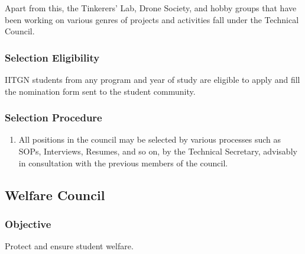 \documentclass[12pt]{article}
\begin{document}
Apart from this, the Tinkerers’ Lab, Drone Society, and hobby groups that have been working on various genres of projects and activities fall under the Technical Council.

\subsubsection{Selection Eligibility}
IITGN students from any program and year of study are eligible to apply and fill the nomination form sent to the student community.

\subsubsection{Selection Procedure}
\begin{enumerate}
    \item All positions in the council may be selected by various processes such as SOPs, Interviews, Resumes, and so on, by the Technical Secretary, advisably in consultation with the previous members of the council.
\end{enumerate}


\newpage
\subsection{Welfare Council}
\subsubsection{Objective}
Protect and ensure student welfare.
\end{document}

